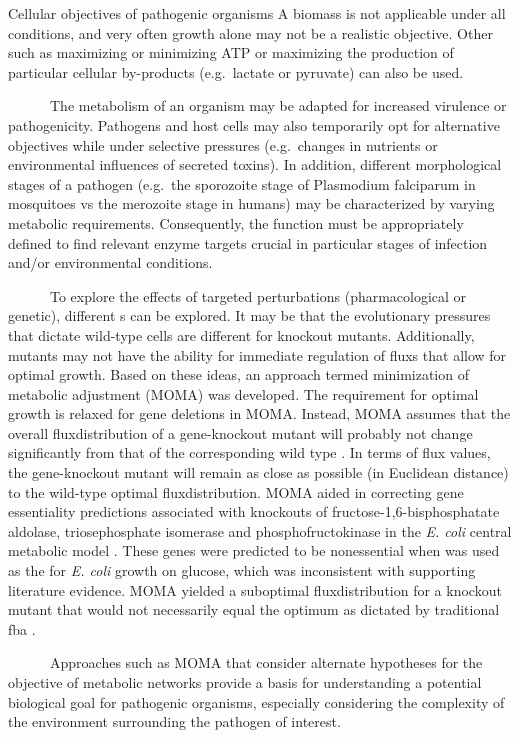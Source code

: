 \begin{pabox}[label=trends:box:objective]{Cellular objectives of pathogenic organisms}
A \gls{biomass} is not applicable under 
all conditions, and very often growth alone may not be 
a realistic objective. Other  such as maximizing 
or minimizing ATP or maximizing the production of 
particular cellular by-products (e.g.\ lactate or pyruvate) 
can also be used.

~~~~~~The metabolism of an organism may be adapted for increased 
virulence or pathogenicity. Pathogens and host cells may 
also temporarily opt for alternative objectives while under 
selective pressures (e.g.\ changes in nutrients or 
environmental influences of secreted toxins). In addition, 
different morphological stages of a pathogen (e.g.\ the sporozoite 
stage of Plasmodium falciparum in mosquitoes vs the merozoite 
stage in humans) may be characterized by varying metabolic 
requirements. Consequently, the  function must be 
appropriately defined to find relevant enzyme targets crucial 
in particular stages of infection and/or environmental conditions.

~~~~~~To explore the effects of targeted perturbations 
(pharmacological or genetic), different s 
can be explored. It may be that the evolutionary 
pressures that dictate wild-type cells are different 
for knockout mutants. Additionally, mutants may 
not have the ability for immediate regulation of 
\glspl{flux} that allow for optimal growth. Based on these 
ideas, an approach termed minimization of metabolic 
adjustment (MOMA) was developed. The requirement for 
optimal growth is relaxed for gene deletions in MOMA. 
Instead, MOMA assumes that the overall \gls{fluxdistribution} 
of a gene-knockout mutant will probably not change 
significantly from that of the corresponding wild type \cite{Segre:2002jp}. 
In terms of \gls{flux} values, the gene-knockout mutant will 
remain as close as possible (in Euclidean distance) to 
the wild-type optimal \gls{fluxdistribution}. MOMA aided in correcting 
gene essentiality predictions associated with knockouts 
of fructose-1,6-bisphosphatate aldolase, triosephosphate 
isomerase and phosphofructokinase in the \textit{E. coli }
central metabolic model \cite{Segre:2002jp}. These genes were predicted 
to be nonessential when  was used as the  
for \textit{E. coli} growth on glucose, which was inconsistent with 
supporting literature evidence. MOMA yielded a suboptimal 
\gls{fluxdistribution} for a knockout mutant that would not 
necessarily equal the optimum as dictated by traditional 
\gls{fba} \cite{Segre:2002jp}.

~~~~~~Approaches such as MOMA that consider alternate hypotheses 
for the objective of metabolic networks provide a basis 
for understanding a potential biological goal for pathogenic 
organisms, especially considering the complexity of the 
environment surrounding the pathogen of interest.
\end{pabox}
